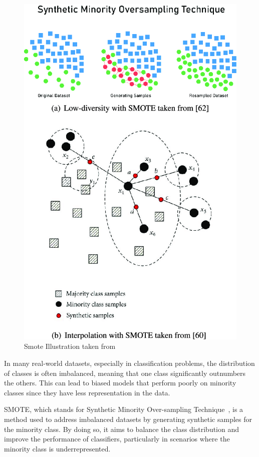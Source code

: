     \begin{figure}
        \centering
        \includegraphics[width=0.8\linewidth]{images/smote_img.png}
        \caption{Smote Illustration taken from~\cite{smoteimg,smoteimg60}}
        \label{fig:smote_img}
    \end{figure}
    
    In many real-world datasets, especially in classification problems, the distribution of classes is often imbalanced, meaning that one class significantly outnumbers the others. This can lead to biased models that perform poorly on minority classes since they have less representation in the data.
    
    SMOTE, which stands for Synthetic Minority Over-sampling Technique~\cite{smote}, is a method used to address imbalanced datasets by generating synthetic samples for the minority class. By doing so, it aims to balance the class distribution and improve the performance of classifiers, particularly in scenarios where the minority class is underrepresented.
    
